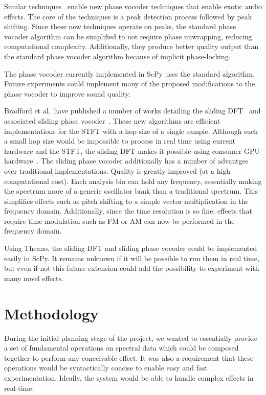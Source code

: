 \documentclass{article}
\begin{document}
Similar techniques~\cite{laroche1999new} enable new phase vocoder techniques that enable
exotic audio effects. The core of the techniques is a peak detection process followed by peak
shifting. Since these new techniques operate on peaks, the standard phase vocoder algorithm can be
simplified to not require phase unwrapping, reducing computational complexity. Additionally, they
produce better quality output than the standard phase vocoder algorithm because of implicit
phase-locking.

The phase vocoder currently implemented in ScPy uses the standard algorithm. Future experiments
could implement many of the proposed modifications to the phase vocoder to improve sound quality.

Bradford et al.\ have published a number of works detailing the sliding
DFT~\cite{bradford2005sliding} and associated sliding phase vocoder~\cite{bradford2007sliding}.
These new algorithms are efficient implementations for the STFT with a hop size of a single sample.
Although such a small hop size would be impossible to process in real time using current hardware
and the STFT, the sliding DFT makes it possible using consumer GPU
hardware~\cite{bradford2011real}. The sliding phase vocoder additionally has a number of advantges
over traditional implementations. Quality is greatly improved (at a high computational cost). Each
analysis bin can hold any frequency, essentially making the spectrum more of a generic oscillator
bank than a traditional spectrum. This simplifies effects such as pitch shifting to a simple vector
multiplication in the frequency domain. Additionally, since the time resolution is so fine, effects
that require time modulation such as FM or AM can now be performed in the frequency domain.

Using Theano, the sliding DFT and sliding phase vocoder could be implemented easily in ScPy. It
remains unknown if it will be possible to run them in real time, but even if not this future
extension could add the possibility to experiment with many novel effects.

\section{Methodology}\label{sec:methodology}

During the initial planning stage of the project, we wanted to essentially provide a set of
fundamental operations on spectral data which could be composed together to perform any conceivable
effect. It was also a requirement that these operations would be syntactically concise to enable
easy and fast experimentation. Ideally, the system would be able to handle complex effects in
real-time.
\end{document}
